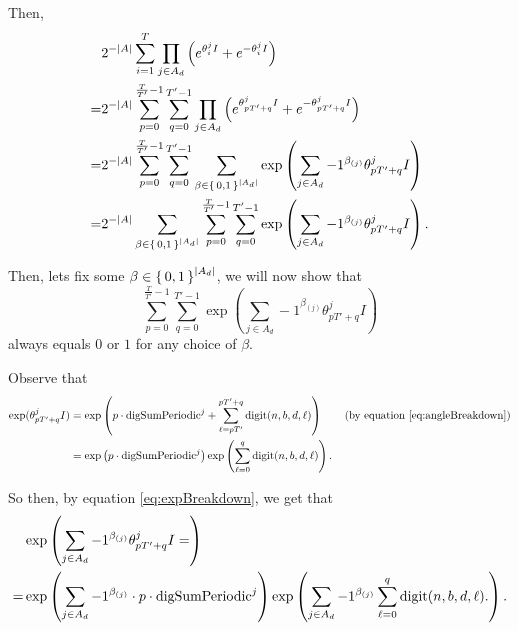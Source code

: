 \documentclass[11pt,titlepage]{article}
\newcommand{\rationalPeriodTotal}{{T}'}
\newcommand{\seedAngle}[1]{{\theta^j_{#1}}}
\newcommand{\totalPeriod}{T}
\newcommand{\digSumPeriodic}{\mathrm{digSumPeriodic}^j}
\begin{document}
Then, 
\begin{align*}
 &2^{-|A|} \sum_{i = 1}^T \prod_{j \in A_d} \left(e^{\seedAngle{i} I} +  e^{-\seedAngle{i} I}\right)\\
 =& 2^{-|A|} \sum_{p= 0}^{\frac{\totalPeriod}{\rationalPeriodTotal} - 1} \sum_{q = 0}^{\rationalPeriodTotal - 1}\prod_{j \in A_d} \left(e^{\seedAngle{p \rationalPeriodTotal + q} I} +  e^{-\seedAngle{p \rationalPeriodTotal + q} I}\right)\\
 =&
  2^{-|A|} \sum_{p= 0}^{\frac{\totalPeriod}{\rationalPeriodTotal} - 1} \sum_{q = 0}^{\rationalPeriodTotal - 1}
 \sum_{\beta \in \set{0,1}^{|A_d|}} 
    \exp\left(
        \sum_{j \in A_d} -1 ^ {\beta_{(j)}}
        \seedAngle{p \rationalPeriodTotal + q}I
      \right)\\
 =&
  2^{-|A|} 
 \sum_{\beta \in \set{0,1}^{|A_d|}} 
     \sum_{p= 0}^{\frac{\totalPeriod}{\rationalPeriodTotal} - 1} \sum_{q = 0}^{\rationalPeriodTotal - 1}
    \exp\left(
        \sum_{j \in A_d} -1 ^ {\beta_{(j)}}
        \seedAngle{p \rationalPeriodTotal + q}I
      \right).
\end{align*}

\newcommand{\eqWTSInnerProd}{
  \sum_{p= 0}^{\frac{\totalPeriod}{\rationalPeriodTotal} - 1} \sum_{q = 0}^{\rationalPeriodTotal - 1}
    \exp\left(
        \sum_{j \in A_d} -1 ^ {\beta_{(j)}}
        \seedAngle{p \rationalPeriodTotal + q}I
      \right)}

Then, lets fix some $\beta \in \set{0, 1}^{|A_d|}$, we will now show that 
\begin{equation}
\label{eq:wts01}  
  \eqWTSInnerProd
\end{equation}
always equals $0$ or $1$ for any choice of $\beta$.

Observe that 
\begin{align}
  \exp(\seedAngle{p \rationalPeriodTotal + q}I) &= \exp\left(p \cdot \digSumPeriodic +
    \sum_{\ell = p \rationalPeriodTotal}^{p \rationalPeriodTotal + q}\mathrm{digit}(n, b, d, \ell)\right) \tag{by equation \eqref{eq:angleBreakdown}} \\
    \label{eq:expBreakdown}
    &= \exp\left(p \cdot \digSumPeriodic\right) \exp\left(\sum_{\ell = 0}^{q}\mathrm{digit}(n, b, d, \ell)\right).
\end{align}

So then, by equation \eqref{eq:expBreakdown}, we get that
\begin{align}
&\exp\left(
    \sum_{j \in A_d} -1 ^ {\beta_{(j)}}
    \seedAngle{p \rationalPeriodTotal + q}I = 
\right)\notag \\ 
\label{eq:decomposeExp}
=&
\exp\left(
    \sum_{j \in A_d} -1 ^ {\beta_{(j)}}
    \cdot p \cdot
    \digSumPeriodic
\right)
\exp\left(
    \sum_{j \in A_d} -1 ^ {\beta_{(j)}}
      \sum_{\ell = 0}^{q}\mathrm{digit}(n, b, d, \ell).
\right).
\end{align}
\end{document}
